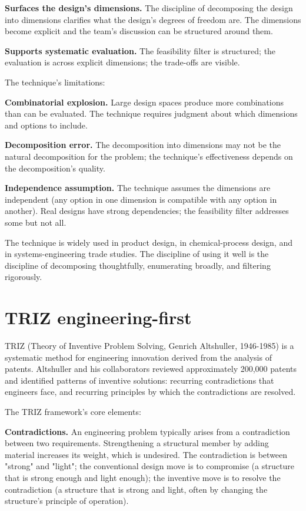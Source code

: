 \textbf{Surfaces the design's dimensions.} The discipline of decomposing the design into dimensions clarifies what the design's degrees of freedom are. The dimensions become explicit and the team's discussion can be structured around them.

\textbf{Supports systematic evaluation.} The feasibility filter is structured; the evaluation is across explicit dimensions; the trade-offs are visible.

The technique's limitations:

\textbf{Combinatorial explosion.} Large design spaces produce more combinations than can be evaluated. The technique requires judgment about which dimensions and options to include.

\textbf{Decomposition error.} The decomposition into dimensions may not be the natural decomposition for the problem; the technique's effectiveness depends on the decomposition's quality.

\textbf{Independence assumption.} The technique assumes the dimensions are independent (any option in one dimension is compatible with any option in another). Real designs have strong dependencies; the feasibility filter addresses some but not all.

The technique is widely used in product design, in chemical-process design, and in systems-engineering trade studies. The discipline of using it well is the discipline of decomposing thoughtfully, enumerating broadly, and filtering rigorously.

\section{TRIZ engineering-first}

TRIZ (Theory of Inventive Problem Solving, Genrich Altshuller, 1946-1985) is a systematic method for engineering innovation derived from the analysis of patents. Altshuller and his collaborators reviewed approximately 200{,}000 patents and identified patterns of inventive solutions: recurring contradictions that engineers face, and recurring principles by which the contradictions are resolved.

The TRIZ framework's core elements:

\textbf{Contradictions.} An engineering problem typically arises from a contradiction between two requirements. Strengthening a structural member by adding material increases its weight, which is undesired. The contradiction is between "strong" and "light"; the conventional design move is to compromise (a structure that is strong enough and light enough); the inventive move is to resolve the contradiction (a structure that is strong and light, often by changing the structure's principle of operation).


